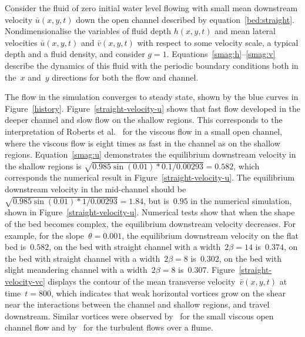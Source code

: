 \documentclass[twocolumn]{afmc_art}
\newcommand{\uu}{{\bar u}}
\newcommand{\vv}{{\bar v}}
\begin{document}
Consider the fluid of zero initial water level flowing with small mean downstream velocity $\uu(x,y,t)$ down the open channel described by equation~\eqref{bed:straight}. 
Nondimensionalise the variables of fluid depth $h(x,y,t)$ and mean lateral velocities $\uu(x,y,t)$ and $\vv(x,y,t)$ with respect to some velocity scale, a typical depth and a fluid density, and consider $g=1$. 
Equations~\eqref{smag:h}--\eqref{smag:v} describe the dynamics of this fluid with the periodic boundary conditions both in the~$x$ and~$y$ directions for both the flow and channel. 

The flow in the simulation converges to steady state, shown by the blue curves in Figure~\ref{history}.
Figure~\ref{straight-velocity-u} shows that fast flow developed in the deeper channel and slow flow on the shallow regions.
This corresponds to the interpretation of Roberts et al.~\cite{Robertsli2006} for the viscous flow in a small open channel, where the viscous flow is eight times as fast in the channel as on the shallow regions. 
Equation~\eqref{smag:u} demonstrates the equilibrium downstream velocity in the shallow regions is $\sqrt{0.985\sin(0.01)*0.1/0.00293}=0.582$, which corresponds the numerical result in Figure~\ref{straight-velocity-u}. 
The equilibrium downstream velocity in the mid-channel should be $\sqrt{0.985\sin(0.01)*1/0.00293}=1.84$, but is~$0.95$ in the numerical simulation, shown in Figure~\ref{straight-velocity-u}. 
Numerical tests show that when the shape of the bed becomes complex, the equilibrium downstream velocity decreases. 
For example, for the slope~$\theta=0.001$, the equilibrium downstream velocity on the flat bed is~$0.582$, on the bed with straight channel with a width~$2\beta=14$ is~$0.374$, on the bed with straight channel with a width~$2\beta=8$ is~$0.302$, on the bed with slight meandering channel with a width~$2\beta=8$ is~$0.307$.
Figure~\ref{straight-velocity-vc} displays the contour of the mean transverse velocity~$\vv(x,y,t)$ at time~$t=800$, which indicates that weak horizontal vortices grow on the shear near the interactions between the channel and shallow regions, and travel downstream. 
Similar vortices were observed by~\cite{Robertsli2006} for the small viscous open channel flow and by~\cite{Bousmar2003a} for the turbulent flows over a flume. 
\end{document}
